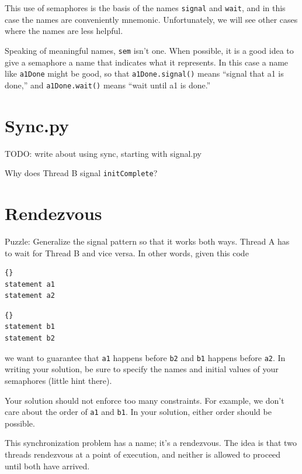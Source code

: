 \documentclass{book}
\begin{document}
This use of semaphores is the basis of the names {\tt signal}
and {\tt wait}, and in this case the names are conveniently
mnemonic.  Unfortunately, we will see other cases where the
names are less helpful.

Speaking of meaningful names, {\tt sem} isn't one.  When
possible, it is a good idea to give a semaphore a name
that indicates what it represents.  In this case a name like
{\tt a1Done} might be good, so that {\tt a1Done.signal()} means
``signal that a1 is done,'' and {\tt a1Done.wait()} means
``wait until a1 is done.''


\section{Sync.py}
\label{sync.py}

TODO: write about using sync, starting with signal.py

Why does Thread B signal {\tt initComplete}?



\section{Rendezvous}
\label{rendezvous}

Puzzle: Generalize the signal pattern so that it works both
ways.  Thread A has to wait for Thread B and vice versa.  In other
words, given this code

\begin{minipage}[t]{2in}
\begin{lstlisting}[title={Thread A}]{}
statement a1
statement a2
\end{lstlisting}
\end{minipage}
\hfill
\begin{minipage}[t]{2in}
\begin{lstlisting}[title={Thread B}]{}
statement b1
statement b2
\end{lstlisting}
\end{minipage}
%
we want to guarantee that {\tt a1} happens before {\tt b2} and
{\tt b1} happens before {\tt a2}.  In writing your solution, be sure
to specify the names and initial values of your semaphores
(little hint there).

Your solution should not enforce too many constraints.  For example,
we don't care about the order of {\tt a1} and {\tt b1}.  In your
solution, either order should be possible.

This synchronization problem has a name; it's a
rendezvous.  The idea is that two threads rendezvous
at a point of execution, and neither is allowed to proceed
until both have arrived.
\end{document}
